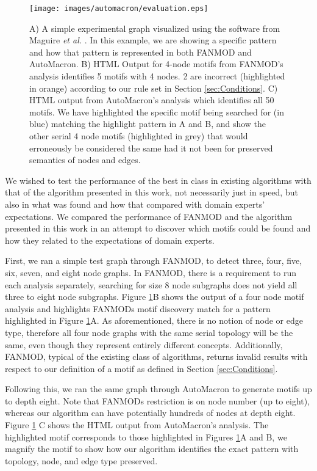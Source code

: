 \begin{figure}[ht!]
\centering
\texttt{[image: images/automacron/evaluation.eps]}
\caption{A) A simple experimental graph visualized using the software from Maguire \emph{et al.} \cite{Maguire:2012:TVCG}. In this example, we are showing a specific pattern and how that pattern is represented in both FANMOD and AutoMacron. B) HTML Output for 4-node motifs from FANMOD's analysis identifies 5 motifs with 4 nodes. 2 are incorrect (highlighted in orange) according to our rule set in Section \ref{sec:Conditions}. C) HTML output from AutoMacron's analysis which identifies all 50 motifs. We have highlighted the specific motif being searched for (in blue) matching the highlight pattern in A and B, and show the other serial 4 node motifs (highlighted in grey) that would erroneously be considered the same had it not been for preserved semantics of nodes and edges.}
\vspace{-4mm}
\label{fig:automacron-evaluation}
\end{figure}

We wished to test the performance of the best in class in existing algorithms with that of the algorithm presented in this work, not necessarily just in speed, but also in what was found and how that compared with domain experts' expectations.
We compared the performance of FANMOD \cite{wernicke06} and the algorithm presented in this work in an attempt to discover which motifs could be found and how they related to the expectations of domain experts.

First, we ran a simple test graph through FANMOD, to detect three, four, five, six, seven, and eight node graphs.
In FANMOD, there is a requirement to run each analysis separately, searching for size 8 node subgraphs does not yield all three to eight node subgraphs.
Figure \ref{fig:automacron-evaluation}B shows the output of a four node motif analysis and highlights FANMODs motif discovery match for a pattern highlighted in Figure \ref{fig:automacron-evaluation}A.
As aforementioned, there is no notion of node or edge type, therefore all four node graphs with the same serial topology will be the same, even though they represent entirely different concepts.
Additionally, FANMOD, typical of the existing class of algorithms, returns invalid results with respect to our definition of a motif as defined in Section \ref{sec:Conditions}.

Following this, we ran the same graph through AutoMacron to generate motifs up to depth eight. Note that FANMODs restriction is on node number (up to eight), whereas our algorithm can have potentially hundreds of nodes at depth eight. Figure \ref{fig:automacron-evaluation} C shows the HTML output from AutoMacron's analysis. The highlighted motif corresponds to those highlighted in Figures \ref{fig:automacron-evaluation}A and B, we magnify the motif to show how our algorithm identifies the exact pattern with topology, node, and edge type preserved.

